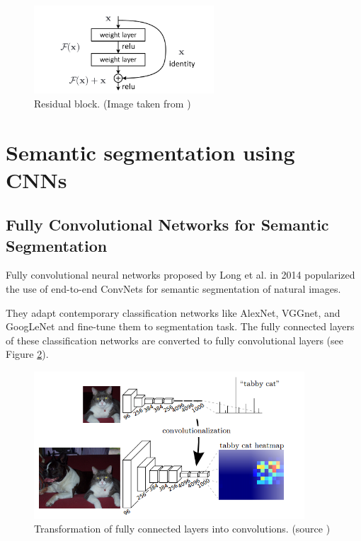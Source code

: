 \begin{figure}[h]
	\centerline{\includegraphics[width=0.6\textwidth]{images/residual_block.png}}
	\caption[Residual block]{Residual block. (Image taken from \cite{bib:he2016deep})}
	\label{img:residual_block}
\end{figure}

\section{Semantic segmentation using CNNs}
\label{sec:semantic_seg_cnn}

\subsection{Fully Convolutional Networks for Semantic Segmentation}
\label{sec:semantic_seg_cnn:fcn}

Fully convolutional neural networks proposed by Long et al. \cite{bib:long2015fully}
in 2014 popularized the use of end-to-end ConvNets for semantic segmentation of natural images.

They adapt contemporary classification networks like AlexNet, VGGnet, and GoogLeNet
and fine-tune them to segmentation task. The fully connected layers of these
classification networks are converted to fully convolutional layers
(see Figure \ref{img:transforming_fc_to_conv}).

\begin{figure}[h]
	\centerline{\includegraphics[width=0.9\textwidth]{images/transforming_fc_to_conv.png}}
	\caption[Transformation of fully connected layers into convolutions]{Transformation of fully connected layers into convolutions. (source \cite{bib:long2015fully})}
	\label{img:transforming_fc_to_conv}
\end{figure}

